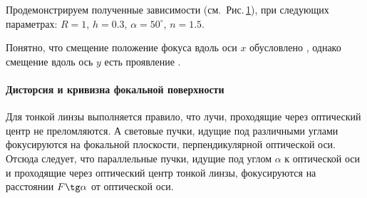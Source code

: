 Продемонстрируем полученные зависимости (см.~Рис.\,\ref{pic:coma}), при следующих параметрах: $R = 1$, $h = 0.3$, $\alpha = 50^\circ$, $n=1.5$.

\begin{figure}[h]
	\begin{subfigure}{0.49\tw}
	\end{subfigure}
	\hfill
	\begin{subfigure}{0.49\tw}
	\end{subfigure}
	\caption{}
	\label{pic:coma}
\end{figure}

Понятно, что смещение положение фокуса вдоль оси $x$ обусловлено , однако смещение вдоль ось $y$ есть проявление .

\paragraph{Дисторсия и кривизна фокальной поверхности}
Для тонкой линзы выполняется правило, что лучи, проходящие через оптический центр не преломляются. А световые пучки, идущие под различными углами фокусируются на фокальной плоскости, перпендикулярной оптической оси. Отсюда следует, что параллельные пучки, идущие под углом $\alpha$ к оптической оси и проходящие через оптический центр тонкой линзы, фокусируются на расстоянии $F \tg \alpha$ от оптической оси. 

